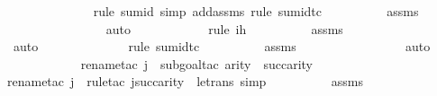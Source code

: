 \begin{isabellebody}
\ \ \ \ \ \ \ \ \ \ \ \ \ \isamarkupfalse%
{\isacharparenleft}{\kern0pt}rule\ sum{\isacharunderscore}{\kern0pt}id{}{\isacharcomma}{\kern0pt}\ simp\ add{\isacharcolon}{\kern0pt}assms{}{\isacharcomma}{\kern0pt}\ rule\ sum{\isacharunderscore}{\kern0pt}id{\isacharunderscore}{\kern0pt}tc{\isacharparenright}{\kern0pt}\isanewline
\ \ \ \ \ \ \ \ \isamarkupfalse%
\ assms{}\isanewline
\ \ \ \ \ \ \ \ \ \ \ \ \ \ \isamarkupfalse%
\ auto{\isacharbrackleft}{\kern0pt}{}{\isacharbrackright}{\kern0pt}\isanewline
\ \ \ \ \ \ \ \ \ \ \ \isamarkupfalse%
{\isacharparenleft}{\kern0pt}rule\ ih{\isacharparenright}{\kern0pt}\isanewline
\ \ \ \ \ \ \ \ \isamarkupfalse%
\ assms{}\isanewline
\ \ \ \ \ \ \ \ \ \ \ \ \ \ \ \isamarkupfalse%
\ auto{\isacharbrackleft}{\kern0pt}{}{\isacharbrackright}{\kern0pt}\isanewline
\ \ \ \ \ \ \ \ \ \ \ \ \ \isamarkupfalse%
{\isacharparenleft}{\kern0pt}rule\ sum{\isacharunderscore}{\kern0pt}id{\isacharunderscore}{\kern0pt}tc{\isacharparenright}{\kern0pt}\isanewline
\ \ \ \ \ \ \ \ \isamarkupfalse%
\ assms{}\isanewline
\ \ \ \ \ \ \ \ \ \ \ \ \ \ \ \isamarkupfalse%
\ auto{\isacharbrackleft}{\kern0pt}{}{\isacharbrackright}{\kern0pt}\isanewline
\ \ \ \ \ \ \ \ \ \ \ \isamarkupfalse%
{\isacharparenleft}{\kern0pt}rename{\isacharunderscore}{\kern0pt}tac\ j\ {\isasympsi}{\isacharcomma}{\kern0pt}\ subgoal{\isacharunderscore}{\kern0pt}tac\ {\isachardoublequoteopen}arity{\isacharparenleft}{\kern0pt}{\isasympsi}{\isacharparenright}{\kern0pt}\ {\isasymle}\ succ{\isacharparenleft}{\kern0pt}arity{\isacharparenleft}{\kern0pt}{\isasymphi}{\isacharparenright}{\kern0pt}{\isacharparenright}{\kern0pt}{\isachardoublequoteclose}{\isacharparenright}{\kern0pt}\isanewline
\ \ \ \ \ \ \ \ \ \ \ \ \isamarkupfalse%
{\isacharparenleft}{\kern0pt}rename{\isacharunderscore}{\kern0pt}tac\ j\ {\isasympsi}{\isacharcomma}{\kern0pt}\ rule{\isacharunderscore}{\kern0pt}tac\ j{\isacharequal}{\kern0pt}{\isachardoublequoteopen}succ{\isacharparenleft}{\kern0pt}arity{\isacharparenleft}{\kern0pt}{\isasymphi}{\isacharparenright}{\kern0pt}{\isacharparenright}{\kern0pt}{\isachardoublequoteclose}\ \ le{\isacharunderscore}{\kern0pt}trans{\isacharcomma}{\kern0pt}\ simp{\isacharparenright}{\kern0pt}\isanewline
\ \ \ \ \ \ \ \ \isamarkupfalse%
\ assms{}\isanewline
\ \ \ \ \ \ \ \ \ \ \ \ \isamarkupfalse%

\end{isabellebody}
